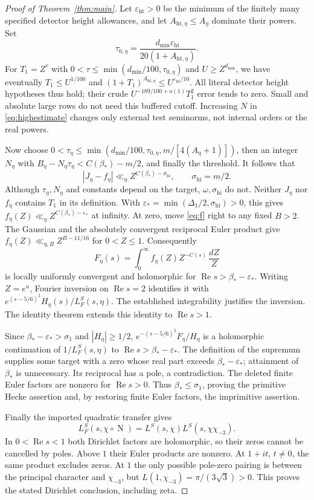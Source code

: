 \documentclass[11pt,a4paper]{article}
\theoremstyle{definition}
\newcommand{\Rea}{\operatorname{Re}}
\newcommand{\N}{\operatorname{N}}
\newcommand{\eps}{\varepsilon}
\newcommand{\sig}{\sigma_1}
\newcommand{\bet}{\beta_*}
\newcommand{\LL}{L_F^S}
\begin{document}
\begin{proof}[Proof of Theorem~\ref{thm:main}]
Let $\eps_{\mathrm{ht}}>0$ be the minimum of the finitely many
specified detector height allowances, and let
$A_{\mathrm{ht},\eta}\le A_\eta$ dominate their powers. Set
\[
 \tau_{0,\eta}=
 \frac{d_{\min}\eps_{\mathrm{ht}}}{20(1+A_{\mathrm{ht},\eta})}.
\]
For $T_1=Z^\tau$ with
$0<\tau\le\min(d_{\min}/100,\tau_{0,\eta})$ and
$U\ge Z^{d_{\min}}$, we have eventually
$T_1\le U^{1/100}$ and
$(1+T_1)^{A_{\mathrm{ht},\eta}}\le U^{\eps_{\mathrm{ht}}/10}$.
All literal detector height hypotheses thus hold; their crude
$U^{-189/100+o(1)}T_1^2$ error tends to zero.
Small and absolute large rows do not need this buffered cutoff.
Increasing $N$ in \eqref{eq:highestimate} changes only external
test seminorms, not internal orders or the real powers.

Now choose
$0<\tau_\eta\le\min(d_{\min}/100,\tau_{0,\eta},
m/[4(A_\eta+1)])$, then an integer $N_\eta$ with
$B_\eta-N_\eta\tau_\eta<C(\bet)-m/2$, and finally the threshold.
It follows that
\[
 |J_\eta-f_\eta|\ll_\eta Z^{C(\bet)-\sigma_{\mathrm{hi}}},
 \qquad \sigma_{\mathrm{hi}}=m/2.
\]
Although $\tau_\eta,N_\eta$ and constants depend on the target,
$\omega,\sigma_{\mathrm{hi}}$ do not. Neither $J_\eta$ nor
$f_\eta$ contains $T_1$ in its definition.
With $\eps_*=\min(\Delta_1/2,\sigma_{\mathrm{hi}})>0$, this gives
$f_\eta(Z)\ll_\eta Z^{C(\bet)-\eps_*}$ at infinity.
At zero, move \eqref{eq:f} right to any fixed $B>2$.
The Gaussian and the absolutely convergent reciprocal Euler product
give $f_\eta(Z)\ll_{\eta,B} Z^{B-11/16}$ for $0<Z\le1$.
Consequently
\[
 F_\eta(s)=\int_0^\infty f_\eta(Z)Z^{-C(s)}\,\frac{dZ}{Z}
\]
is locally uniformly convergent and holomorphic for
$\Rea s>\bet-\eps_*$.
Writing $Z=e^u$, Fourier inversion on $\Rea s=2$ identifies it with
$e^{(s-5/6)^2}H_\eta(s)/\LL(s,\eta)$.
The established integrability justifies the inversion.
The identity theorem extends this identity to $\Rea s>1$.

Since $\bet-\eps_*>\sig$ and $|H_\eta|\ge1/2$,
$e^{-(s-5/6)^2}F_\eta/H_\eta$ is a holomorphic continuation of
$1/\LL(s,\eta)$ to $\Rea s>\bet-\eps_*$.
The definition of the supremum supplies some target with a zero
whose real part exceeds $\bet-\eps_*$; attainment of $\bet$ is
unnecessary. Its reciprocal has a pole, a contradiction.
The deleted finite Euler factors are nonzero for $\Rea s>0$.
Thus $\bet\le\sig$, proving the primitive Hecke assertion and,
by restoring finite Euler factors, the imprimitive assertion.

Finally the imported quadratic transfer gives
\[
 L_F^S(s,\chi\circ\N)
     =L^S(s,\chi)L^S(s,\chi\chi_{-3}).
\]
In $0<\Rea s<1$ both Dirichlet factors are holomorphic, so their
zeros cannot be cancelled by poles. Above $1$ their Euler products
are nonzero. At $1+it$, $t\ne0$, the same product excludes zeros.
At $1$ the only possible pole-zero pairing is between the principal
character and $\chi_{-3}$, but
$L(1,\chi_{-3})=\pi/(3\sqrt3)>0$.
This proves the stated Dirichlet conclusion, including zeta.
\end{proof}
\end{document}
